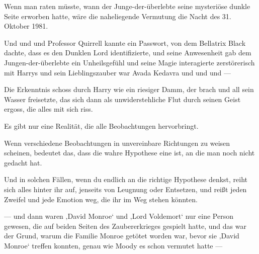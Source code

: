 Wenn man raten müsste, wann der Junge-der-überlebte seine mysteriöse dunkle Seite erworben hatte, wäre die naheliegende Vermutung die Nacht des 31. Oktober 1981.

\later

Und und und Professor Quirrell kannte ein Passwort, von dem Bellatrix Black dachte, dass es den Dunklen Lord identifizierte, und seine Anwesenheit gab dem Jungen-der-überlebte ein Unheilsgefühl und seine Magie interagierte zerstörerisch mit Harrys und sein Lieblingszauber war Avada Kedavra und und und —

Die Erkenntnis schoss durch Harry wie ein riesiger Damm, der brach und all sein Wasser freisetzte, das sich dann als unwiderstehliche Flut durch seinen Geist ergoss, die alles mit sich riss.

Es gibt nur eine Realität, die alle Beobachtungen hervorbringt.

Wenn verschiedene Beobachtungen in unvereinbare Richtungen zu weisen scheinen, bedeutet das, dass die wahre Hypothese eine ist, an die man noch nicht gedacht hat.

Und in solchen Fällen, wenn du endlich an die richtige Hypothese denkst, reiht sich alles hinter ihr auf, jenseits von Leugnung oder Entsetzen, und reißt jeden Zweifel und jede Emotion weg, die ihr im Weg stehen könnten.

— und dann waren ‚David Monroe‘ und ‚Lord Voldemort‘ nur eine Person gewesen, die auf beiden Seiten des Zaubererkrieges gespielt hatte, und das war der Grund, warum die Familie Monroe getötet worden war, bevor sie ‚David Monroe‘ treffen konnten, genau wie Moody es schon vermutet hatte —

